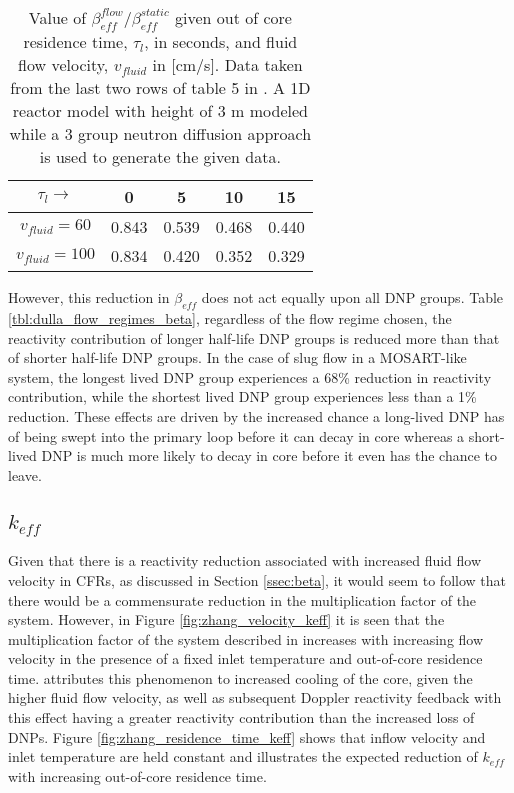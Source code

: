 \documentclass[review]{elsarticle}
\begin{document}
\begin{table}[h]
    \caption{Value of $\beta_{eff}^{flow}/\beta_{eff}^{static}$ given out of
        core residence time, $\tau_{l}$, in seconds, 
        and fluid flow velocity, $v_{fluid}$ in [cm/s]. Data taken from
        the last two rows of table 5
        in \cite{mattioda_effective_2000}. A 1D reactor model with height of 3 m
        modeled while a 3 group neutron diffusion approach is used to generate
        the given data.} 
    \label{tbl:mattioda_beta_reduction}
    \begin{center}
        \begin{tabular}{|c|c|c|c|c|}
            \hline
            $\tau_{l}\rightarrow$ & 0 & 5 & 10 & 15 \\
            \hline
            $v_{fluid} = 60$ & 0.843 & 0.539 & 0.468 & 0.440 \\
            \hline
            $v_{fluid} = 100$ & 0.834 & 0.420 & 0.352 & 0.329 \\
            \hline
        \end{tabular}
    \end{center}
\end{table}

However,
this reduction in $\beta_{eff}$ does not act equally upon all DNP groups. Table
\ref{tbl:dulla_flow_regimes_beta}, regardless of the flow regime chosen,
the reactivity contribution of longer half-life DNP groups is
reduced more than that of shorter half-life DNP groups. In the case of slug
flow in a MOSART-like system, the longest lived DNP group experiences a 68\%
reduction in reactivity contribution, while the shortest lived DNP group
experiences less than a 1\% reduction. These effects are driven by the increased
chance a long-lived DNP has of being swept into the primary loop before it can
decay in core whereas a short-lived DNP is much more likely to decay in core
before it even has the chance to leave.

\subsection{$k_{eff}$} \label{ssec:keff}
Given that there is a reactivity reduction associated with increased fluid flow
velocity in CFRs, as discussed in Section \ref{ssec:beta}, it would seem to follow
that there would be a commensurate reduction in the multiplication factor of
the system. However, in Figure \ref{fig:zhang_velocity_keff} it is seen that the
multiplication factor of the system described in \cite{zhang_development_2009-1}
increases with increasing flow velocity in the presence of a fixed inlet temperature and out-of-core
residence time. \cite{zhang_development_2009-1} attributes
this phenomenon to increased cooling of the core, given the higher fluid flow 
velocity, as well as subsequent Doppler reactivity feedback with this effect
having a greater reactivity contribution than the increased loss of DNPs.
Figure \ref{fig:zhang_residence_time_keff} shows that inflow
 velocity and inlet temperature are held constant and illustrates
 the expected reduction of
 $k_{eff}$ with increasing out-of-core residence time.
\end{document}
